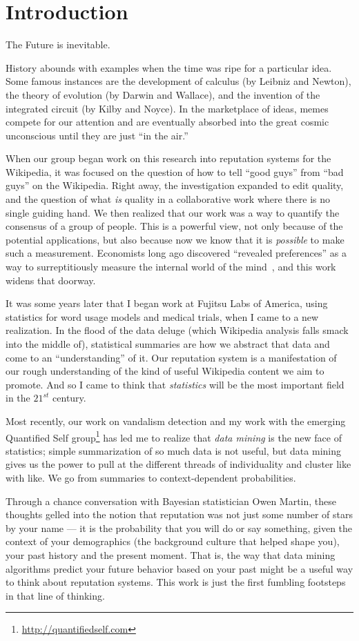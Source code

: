 \section{Introduction}

The Future is inevitable.

History abounds with examples when the time was ripe for a particular idea.
Some famous instances are the development of calculus (by Leibniz and Newton),
the theory of evolution (by Darwin and Wallace), and the invention of
the integrated circuit (by Kilby and Noyce).
In the marketplace of ideas, memes compete for our attention and
are eventually absorbed into the great cosmic unconscious until
they are just ``in the air.''

When our group began work on this research into reputation systems for
the Wikipedia, it was focused on the
question of how to tell ``good guys'' from ``bad guys'' on the Wikipedia.
Right away, the investigation expanded to edit quality, and the question of what
\textit{is} quality in a collaborative work where there is no single
guiding hand.
We then realized that our work was a
way to quantify the consensus of a group of people.
This is a powerful view, not only because of the potential
applications, but also because now we know that it is \textit{possible}
to make such a measurement.
Economists long ago discovered ``revealed preferences''
as a way to surreptitiously measure the internal world of the
mind~\cite{Samuelson1938,Varian2006}, and this work widens that doorway.

It was some years later that I began work at Fujitsu Labs of America,
using statistics for word usage models and medical trials,
when I came to a new realization.
In the flood of the data deluge (which Wikipedia analysis falls smack
into the middle of), statistical summaries are how we abstract that data
and come to an ``understanding'' of it.
Our reputation system is a manifestation of our
rough understanding of the kind of useful Wikipedia content we aim to
promote.
And so I came to think that \textit{statistics} will be the
most important field in the $21^{st}$ century.

Most recently, our work on vandalism detection and my work with the
emerging Quantified Self group\footnote{\url{http://quantifiedself.com}}
has led me to realize that
\textit{data mining} is the new face of statistics; simple summarization
of so much data is not useful, but data mining gives us the power to
pull at the different threads of individuality and cluster like with like.
We go from summaries to context-dependent probabilities.

Through a chance conversation with Bayesian statistician
Owen Martin, these thoughts gelled into the notion that reputation
was not just some number of stars by your name --- it is the probability
that you will do or say something, given the context of your demographics
(\ie the background culture that helped shape you),
your past history and the present moment.
That is, the way that data mining algorithms predict your future
behavior based on your past might be a useful way to think about
reputation systems.
This work is just the first fumbling footsteps in that line of thinking.


